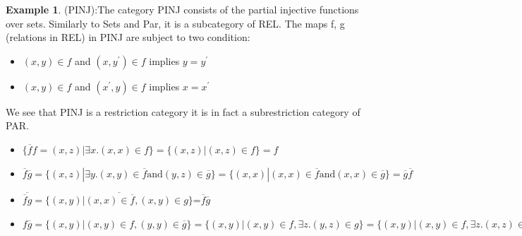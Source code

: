 \documentclass[11pt, oneside]{amsart}
\theoremstyle{definition}
\theoremstyle{definition}
\newtheorem{exmp}{Example}[section]
\begin{document}
\begin{exmp}
(PINJ):The category PINJ consists of the partial injective functions over sets. Similarly
to Sets and Par, it is a subcategory of REL. The maps f, g (relations in REL) in PINJ are
subject to two condition:
\begin{itemize}
    \item $(x,y) \in f$ and $(x,y^{\prime}) \in f$ implies $y=y^{\prime}$
    \item $(x,y) \in f$ and $(x^{\prime},y) \in f$ implies $x=x^{\prime}$
\end{itemize}
We see that PINJ is a restriction category it is in fact a subrestriction category of PAR.
\begin{itemize}
    \item $\{\overline{f}f={{(x,z)|\exists x. (x,x) \in f}\}=\{{(x,z)|(x,z) \in f}\}=f}$
    \item ${\overline{f}\overline{g}=\{(x,z)|\exists y.(x,y)\in \overline{f} \text{and} (y,z) \in \overline{g}\}=\{(x,x)|(x,x) \in \overline{f} \text{and} (x,x) \in \overline{g}\}=\overline{g}\overline{f}}$
    \item ${\overline{\overline{f}g}=\overline{\{(x,y)|(x,x) \in \overline{f}, (x,y)\in g\}}}$=$\overline{f}\overline{g}$
    \item $f\overline{g}=\{(x,y)|(x,y) \in f, (y,y) \in \overline{g}\}=\{(x,y)|(x,y)\in f,\exists z.(y,z)\in g\}=\{(x,y)|(x,y)\in f,\exists z.(x,z)\in fg\}=\{(x,y)|(x,y)\in f,(x,x)\in \overline{fg}\}$
    \end{itemize}
\end{exmp}
\end{document}
